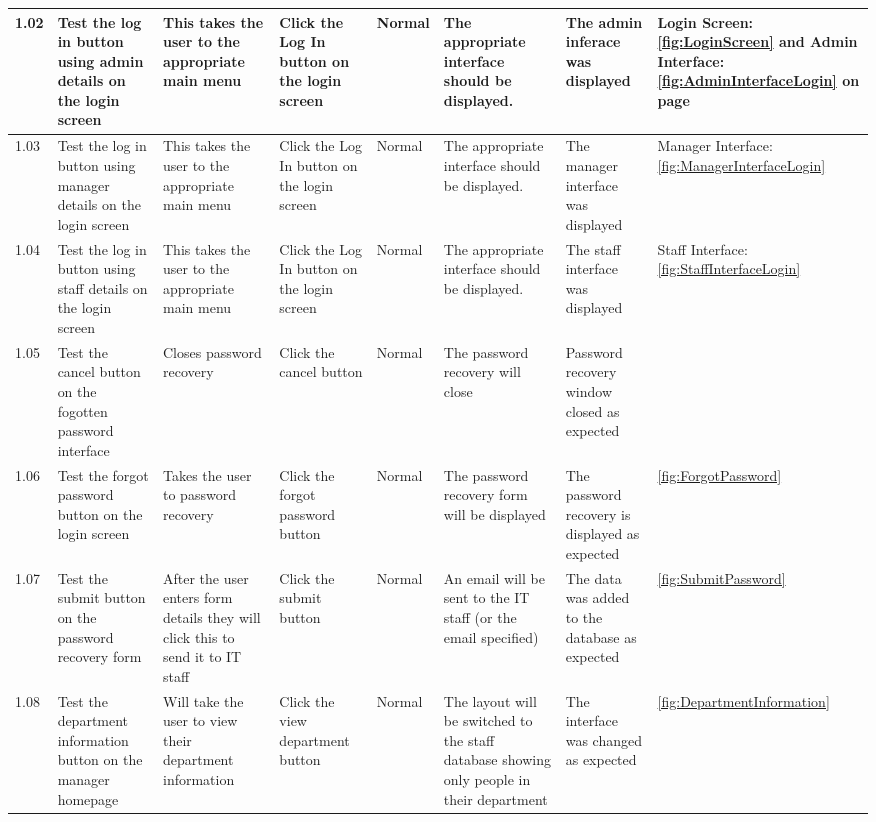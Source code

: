 \begin{landscape}
\begin{center}
\begin{longtable}{|p{1.5cm}|p{2cm}|p{2.5cm}|p{2cm}|p{2cm}|p{2cm}|p{3cm}|p{1.7cm}|}
\rowcolor{lightgray}1.02 & Test the log in button using admin details on the login screen  & This takes the user to the appropriate main menu & Click the Log In button on the login screen & Normal &  The appropriate interface should be displayed.&The admin inferace was displayed & Login Screen: \ref{fig:LoginScreen} and Admin Interface:  \ref{fig:AdminInterfaceLogin} on page \pageref{fig:LoginScreen} \\ \hline
\rowcolor{lightgray}1.03 & Test the log in button using manager details on the login screen  & This takes the user to the appropriate main menu & Click the Log In button on the login screen & Normal &  The appropriate interface should be displayed.& The manager interface was displayed & Manager Interface:  \ref{fig:ManagerInterfaceLogin}  \\ \hline
\rowcolor{lightgray}1.04 & Test the log in button using staff details on the login screen  & This takes the user to the appropriate main menu & Click the Log In button on the login screen & Normal &  The appropriate interface should be displayed.& The staff interface was displayed & Staff Interface:  \ref{fig:StaffInterfaceLogin}  \\ \hline
\rowcolor{lightgray}1.05 & Test the cancel button on the fogotten password interface & Closes password recovery & Click the cancel button & Normal & The password recovery will close & Password recovery window closed as expected &  \\ \hline
1.06 & Test the forgot password button on the login screen & Takes the user to password recovery & Click the forgot password button & Normal & The password recovery form will be displayed & The password recovery is displayed as expected& \ref{fig:ForgotPassword}  \\ \hline
1.07 & Test the submit button on the password recovery form & After the user enters form details they will click this to send it to IT staff & Click the submit button & Normal & An email will be sent to the IT staff (or the email specified) & The data was added to the database as expected &\ref{fig:SubmitPassword} \\ \hline
1.08 & Test the department information button on the manager homepage & Will take the user to view their department information & Click the view department button & Normal & The layout will be switched to the staff database showing only people in their department & The interface was changed as expected&  \ref {fig:DepartmentInformation}   \\ \hline


\end{longtable}
\end{center}
\end{landscape}
